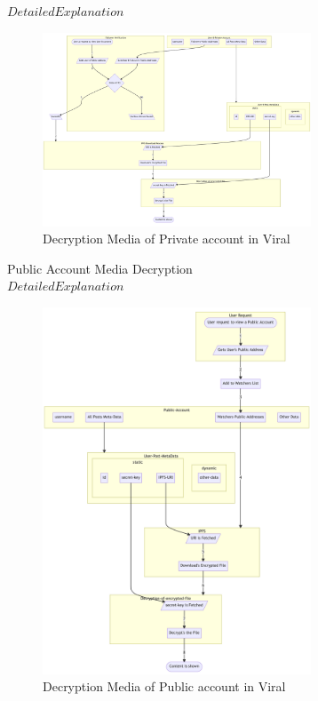 \documentclass[10pt]{article}
\begin{document}
$Detailed Explanation$\\

\begin{figure}[H]
\begin{center}
\includegraphics[width=8cm]{decryption-private}
\caption{Decryption Media of Private account in Viral}
\end{center}
\end{figure}


Public Account Media Decryption\\

$Detailed Explanation$\\

\begin{figure}[H]
\begin{center}
\includegraphics[width=8cm]{decryption-public}
\caption{Decryption Media of Public account in Viral}
\end{center}
\end{figure}
\end{document}
